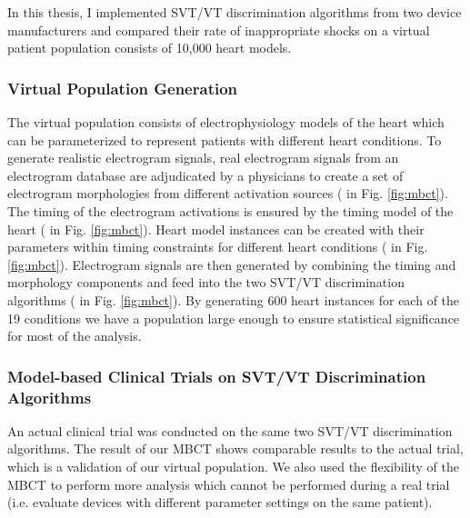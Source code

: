 \documentclass[a4paper,11pt]{article}
\newcommand*\circled[1]{\tikz[baseline=(char.base)]{
		\node[shape=circle,draw,inner sep=2pt] (char) {#1};}}
\begin{document}
In this thesis, I implemented SVT/VT discrimination algorithms from two device manufacturers and compared their rate of inappropriate shocks on a virtual patient population consists of 10,000 heart models.
\subsubsection{Virtual Population Generation}
The virtual population consists of electrophysiology models of the heart which can be parameterized to represent patients with different heart conditions.
To generate realistic electrogram signals, real electrogram signals from an electrogram database are adjudicated by a physicians to create a set of electrogram morphologies from different activation sources (\circled{1} in Fig. \ref{fig:mbct}).
The timing of the electrogram activations is ensured by the timing model of the heart (\circled{2} in Fig. \ref{fig:mbct}).
Heart model instances can be created with their parameters within timing constraints for different heart conditions (\circled{3} in Fig. \ref{fig:mbct}).
Electrogram signals are then generated by combining the timing and morphology components and feed into the two SVT/VT discrimination algorithms (\circled{4} in Fig. \ref{fig:mbct}).
By generating 600 heart instances for each of the 19 conditions we have a population large enough to ensure statistical significance for most of the analysis.

\subsubsection{Model-based Clinical Trials on SVT/VT Discrimination Algorithms}
An actual clinical trial was conducted on the same two SVT/VT discrimination algorithms.
The result of our MBCT shows comparable results to the actual trial, which is a validation of our virtual population.
We also used the flexibility of the MBCT to perform more analysis which cannot be performed during a real trial (i.e. evaluate devices with different parameter settings on the same patient).
\end{document}
